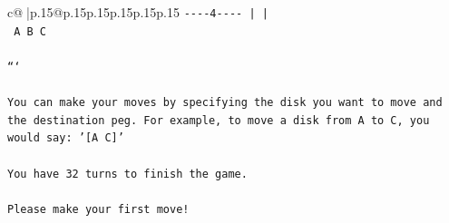 \documentclass{article}
\begin{document}
{\begin{supertabular}{c@{$\;$}|p{.15\linewidth}@{}p{.15\linewidth}p{.15\linewidth}p{.15\linewidth}p{.15\linewidth}p{.15\linewidth}}
{{{\texttt{{-}{-}{-}{-}4{-}{-}{-}{-}     |         |    } \\
\texttt{    A         B         C    } \\
\\ 
\texttt{```} \\
\\ 
\texttt{You can make your moves by specifying the disk you want to move and the destination peg. For example, to move a disk from A to C, you would say: '{[}A C{]}'} \\
\\ 
\texttt{You have 32 turns to finish the game.} \\
\\ 
\texttt{Please make your first move!} \\
            }
        }
    }
     \\ \\


\end{supertabular}}
\end{document}
